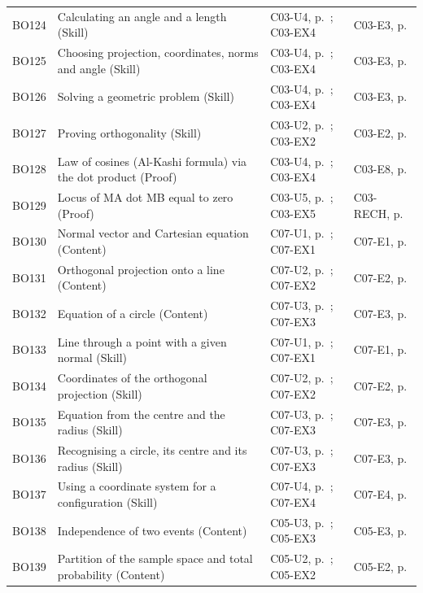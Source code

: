\begin{longtable}{p{.1\linewidth}p{.43\linewidth}p{.19\linewidth}p{.16\linewidth}}
BO124 & Calculating an angle and a length (Skill) & C03-U4, p.\,\pageref{C03-U4} ; C03-EX4 & C03-E3, p.\,\pageref{C03-E3} \\
BO125 & Choosing projection, coordinates, norms and angle (Skill) & C03-U4, p.\,\pageref{C03-U4} ; C03-EX4 & C03-E3, p.\,\pageref{C03-E3} \\
BO126 & Solving a geometric problem (Skill) & C03-U4, p.\,\pageref{C03-U4} ; C03-EX4 & C03-E3, p.\,\pageref{C03-E3} \\
BO127 & Proving orthogonality (Skill) & C03-U2, p.\,\pageref{C03-U2} ; C03-EX2 & C03-E2, p.\,\pageref{C03-E2} \\
BO128 & Law of cosines (Al-Kashi formula) via the dot product (Proof) & C03-U4, p.\,\pageref{C03-U4} ; C03-EX4 & C03-E8, p.\,\pageref{C03-E8} \\
BO129 & Locus of MA dot MB equal to zero (Proof) & C03-U5, p.\,\pageref{C03-U5} ; C03-EX5 & C03-RECH, p.\,\pageref{C03-RECH} \\
BO130 & Normal vector and Cartesian equation (Content) & C07-U1, p.\,\pageref{C07-U1} ; C07-EX1 & C07-E1, p.\,\pageref{C07-E1} \\
BO131 & Orthogonal projection onto a line (Content) & C07-U2, p.\,\pageref{C07-U2} ; C07-EX2 & C07-E2, p.\,\pageref{C07-E2} \\
BO132 & Equation of a circle (Content) & C07-U3, p.\,\pageref{C07-U3} ; C07-EX3 & C07-E3, p.\,\pageref{C07-E3} \\
BO133 & Line through a point with a given normal (Skill) & C07-U1, p.\,\pageref{C07-U1} ; C07-EX1 & C07-E1, p.\,\pageref{C07-E1} \\
BO134 & Coordinates of the orthogonal projection (Skill) & C07-U2, p.\,\pageref{C07-U2} ; C07-EX2 & C07-E2, p.\,\pageref{C07-E2} \\
BO135 & Equation from the centre and the radius (Skill) & C07-U3, p.\,\pageref{C07-U3} ; C07-EX3 & C07-E3, p.\,\pageref{C07-E3} \\
BO136 & Recognising a circle, its centre and its radius (Skill) & C07-U3, p.\,\pageref{C07-U3} ; C07-EX3 & C07-E3, p.\,\pageref{C07-E3} \\
BO137 & Using a coordinate system for a configuration (Skill) & C07-U4, p.\,\pageref{C07-U4} ; C07-EX4 & C07-E4, p.\,\pageref{C07-E4} \\
BO138 & Independence of two events (Content) & C05-U3, p.\,\pageref{C05-U3} ; C05-EX3 & C05-E3, p.\,\pageref{C05-E3} \\
BO139 & Partition of the sample space and total probability (Content) & C05-U2, p.\,\pageref{C05-U2} ; C05-EX2 & C05-E2, p.\,\pageref{C05-E2} \\

\end{longtable}
